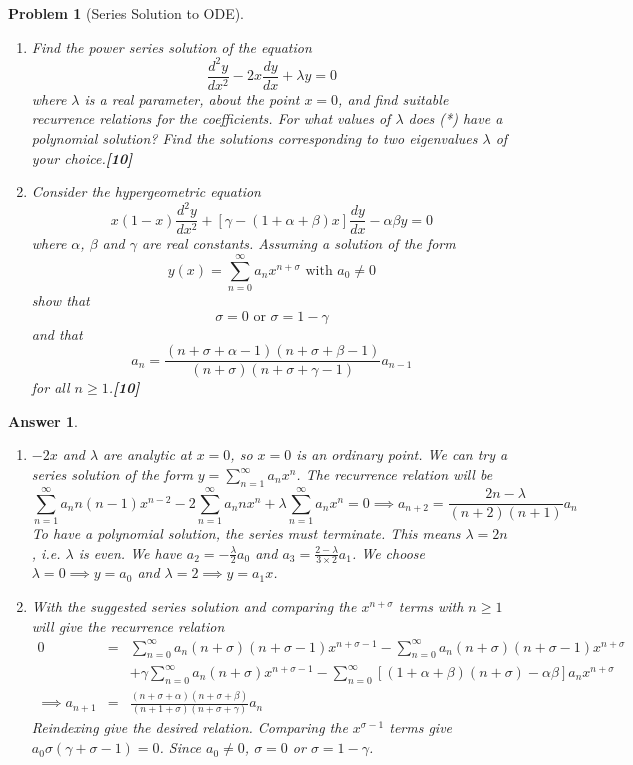 \documentclass[a4paper]{article}
\newtheorem{ans}{Answer}[section]
\theoremstyle{new}
\newtheorem{qns}{Problem}[section]
\begin{document}
\begin{qns}[Series Solution to ODE]\leavevmode
\begin{enumerate}[label=(\alph*)]
\item Find the power series solution of the equation
\begin{equation}
\frac{d^2y}{dx^2}-2x\frac{dy}{dx}+\lambda y=0\tag{*}
\end{equation}
where $\lambda$ is a real parameter, about the point $x = 0$, and find suitable recurrence relations for the coefficients. For what values of $\lambda$ does (*) have a polynomial solution? Find the solutions corresponding to two eigenvalues $\lambda$ of your choice.\hfill\textbf{[10]}
\item Consider the hypergeometric equation
$$x(1-x)\frac{d^2y}{dx^2}+[\gamma-(1+\alpha+\beta)x]\frac{dy}{dx}-\alpha\beta y=0$$
where $\alpha$, $\beta$ and $\gamma$ are real constants. Assuming a solution of the form
$$y(x)=\sum_{n=0}^\infty a_nx^{n+\sigma}\text{ with }a_0\neq 0$$
show that
$$\sigma=0\text{ or   }\sigma=1-\gamma$$
and that
$$a_n=\frac{(n+\sigma+\alpha-1)(n+\sigma+\beta-1)}{(n+\sigma)(n+\sigma+\gamma-1)}a_{n-1}$$
for all $n\geq1$.\hfill\textbf{[10]}
\end{enumerate}
\end{qns}
\begin{ans}\leavevmode
\begin{enumerate}[label=(\alph*)]
\item $-2x$ and $\lambda$ are analytic at $x=0$, so $x=0$ is an ordinary point. We can try a series solution of the form $y=\sum_{n=1}^\infty a_nx^n$. The recurrence relation will be
$$\sum_{n=1}^\infty a_nn(n-1)x^{n-2}-2\sum_{n=1}^\infty a_nnx^n+\lambda\sum_{n=1}^\infty a_nx^n=0\implies a_{n+2}=\frac{2n-\lambda}{(n+2)(n+1)}a_n$$
To have a polynomial solution, the series must terminate. This means $\lambda=2n$, i.e. $\lambda$ is even. We have $a_2=-\frac{\lambda}{2}a_0$ and $a_3=\frac{2-\lambda}{3\times 2}a_1$. We choose $\lambda=0\implies y=a_0$ and $\lambda=2\implies y=a_1x$.
\item With the suggested series solution and comparing the $x^{n+\sigma}$ terms with $n\geq 1$ will give the recurrence relation
\begin{eqnarray}
0&=&\sum_{n=0}^\infty a_n(n+\sigma)(n+\sigma-1)x^{n+\sigma-1}-\sum_{n=0}^\infty a_n(n+\sigma)(n+\sigma-1)x^{n+\sigma}\nonumber\\&&+\gamma\sum_{n=0}^\infty a_n(n+\sigma)x^{n+\sigma-1}-\sum_{n=0}^\infty[(1+\alpha+\beta)(n+\sigma)-\alpha\beta] a_n x^{n+\sigma}\nonumber\\\implies a_{n+1}&=&\frac{(n+\sigma+\alpha)(n+\sigma+\beta)}{(n+1+\sigma)(n+\sigma+\gamma)}a_n\nonumber
\end{eqnarray}
Reindexing give the desired relation. Comparing the $x^{\sigma-1}$ terms give $a_0\sigma(\gamma+\sigma-1)=0$. Since $a_0\neq 0$, $\sigma=0$ or $\sigma=1-\gamma$.
\end{enumerate}
\end{ans}
\end{document}
